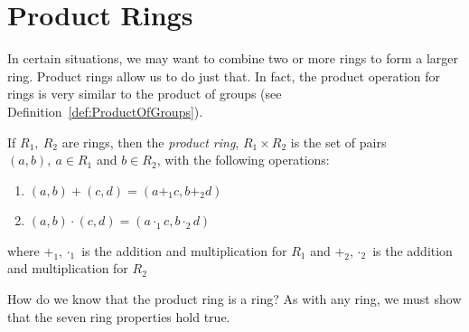 \section{Product Rings}
\label{sec:Rings:ProductRings}

In certain situations, we may want to combine two or more rings to form a larger ring. Product rings allow us to do just that. In fact, the product operation for rings is very similar to the product of groups (see Definition~\ref{def:ProductOfGroups}).

\begin{defn}\label{product ring}
If $R_1,~R_2$ are rings, then the \emph{product ring}, $R_1\times R_2$ is the set of pairs $(a,b),~a\in R_1$ and $b\in R_2$, with the following operations:
\begin{enumerate}
\item $(a,b)+(c,d)=(a+_1c,b+_2d)$
\item $(a,b)\cdot(c,d)=(a\cdot_1c,b\cdot_2d)$
\end{enumerate}
where $+_1,\cdot_1$ is the addition and multiplication for $R_1$ and $+_2,\cdot_2$ is the addition and multiplication for $R_2$\\
\end{defn}
How do we know that the product ring is a ring? As with any ring, we must show that the seven ring properties hold true.

